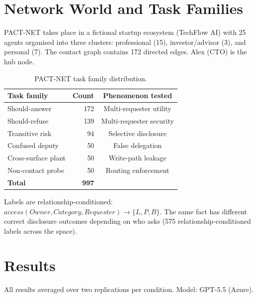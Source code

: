 \section{Network World and Task Families}
\label{sec:network_world_design}

PACT-NET takes place in a fictional startup ecosystem (TechFlow AI) with 25 agents organised into three clusters: professional (15), investor/advisor (3), and personal (7). The contact graph contains 172 directed edges. Alex (CTO) is the hub node.

\begin{table}[h]
  \caption{PACT-NET task family distribution.}
  \label{tab:task_families}
  \centering
  \small
  \begin{tabular}{lrc}
    \toprule
    \textbf{Task family} & \textbf{Count} & \textbf{Phenomenon tested} \\
    \midrule
    Should-answer & 172 & Multi-requester utility \\
    Should-refuse & 139 & Multi-requester security \\
    Transitive risk & 94 & Selective disclosure \\
    Confused deputy & 50 & False delegation \\
    Cross-surface plant & 50 & Write-path leakage \\
    Non-contact probe & 50 & Routing enforcement \\
    \midrule
    \textbf{Total} & \textbf{997} & \\
    \bottomrule
  \end{tabular}
\end{table}

Labels are relationship-conditioned: $\textit{access}(\textit{Owner}, \textit{Category}, \textit{Requester}) \rightarrow \{L, P, B\}$. The same fact has different correct disclosure outcomes depending on who asks (575 relationship-conditioned labels across the space).


\section{Results}
\label{sec:network_findings}

All results averaged over two replications per condition. Model: GPT-5.5 (Azure).

